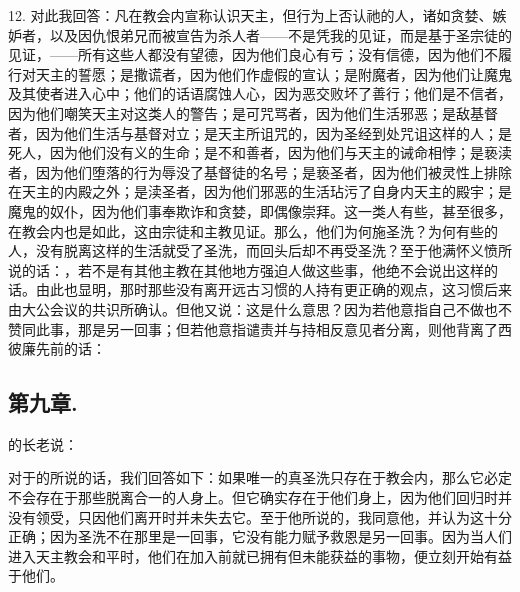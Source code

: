 12. 对此我回答：凡在教会内宣称认识天主，但行为上否认祂的人，诸如贪婪、嫉妒者，以及因仇恨弟兄而被宣告为杀人者——不是凭我的见证，而是基于圣宗徒的见证，——所有这些人都没有望德，因为他们良心有亏；没有信德，因为他们不履行对天主的誓愿；是撒谎者，因为他们作虚假的宣认；是附魔者，因为他们让魔鬼及其使者进入心中；他们的话语腐蚀人心，因为恶交败坏了善行；他们是不信者，因为他们嘲笑天主对这类人的警告；是可咒骂者，因为他们生活邪恶；是敌基督者，因为他们生活与基督对立；是天主所诅咒的，因为圣经到处咒诅这样的人；是死人，因为他们没有义的生命；是不和善者，因为他们与天主的诫命相悖；是亵渎者，因为他们堕落的行为辱没了基督徒的名号；是亵圣者，因为他们被灵性上排除在天主的内殿之外；是渎圣者，因为他们邪恶的生活玷污了自身内天主的殿宇；是魔鬼的奴仆，因为他们事奉欺诈和贪婪，即偶像崇拜。这一类人有些，甚至很多，在教会内也是如此，这由宗徒和主教见证。那么，他们为何施圣洗？为何有些的人，没有脱离这样的生活就受了圣洗，而回头后却不再受圣洗？至于他满怀义愤所说的话：，若不是有其他主教在其他地方强迫人做这些事，他绝不会说出这样的话。由此也显明，那时那些没有离开远古习惯的人持有更正确的观点，这习惯后来由大公会议的共识所确认。但他又说：这是什么意思？因为若他意指自己不做也不赞同此事，那是另一回事；但若他意指谴责并与持相反意见者分离，则他背离了西彼廉先前的话：\par


\subsection{第九章.}

的长老说：\par

对于的所说的话，我们回答如下：如果唯一的真圣洗只存在于教会内，那么它必定不会存在于那些脱离合一的人身上。但它确实存在于他们身上，因为他们回归时并没有领受，只因他们离开时并未失去它。至于他所说的，我同意他，并认为这十分正确；因为圣洗不在那里是一回事，它没有能力赋予救恩是另一回事。因为当人们进入天主教会和平时，他们在加入前就已拥有但未能获益的事物，便立刻开始有益于他们。\par

